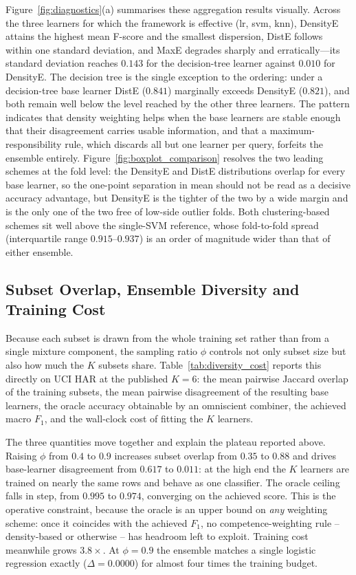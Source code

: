 \documentclass[lettersize,journal]{IEEEtran}
\begin{document}
	Figure~\ref{fig:diagnostics}(a) summarises these aggregation results visually. Across the three
	learners for which the framework is effective (lr, svm, knn), DensityE attains the highest mean
	F-score and the smallest dispersion, DistE follows within one standard deviation, and MaxE degrades
	sharply and erratically---its standard deviation reaches $0.143$ for the decision-tree learner
	against $0.010$ for DensityE. The decision tree is the single exception to the ordering: under a
	decision-tree base learner DistE ($0.841$) marginally exceeds DensityE ($0.821$), and both remain
	well below the level reached by the other three learners. The pattern indicates that density
	weighting helps when the base learners are stable enough that their disagreement carries usable
	information, and that a maximum-responsibility rule, which discards all but one learner per query,
	forfeits the ensemble entirely. Figure~\ref{fig:boxplot_comparison} resolves the two leading
	schemes at the fold level: the DensityE and DistE distributions overlap for every base learner,
	so the one-point separation in mean should not be read as a decisive accuracy advantage, but
	DensityE is the tighter of the two by a wide margin and is the only one of the two free of
	low-side outlier folds. Both clustering-based schemes sit well above the single-SVM reference,
	whose fold-to-fold spread (interquartile range $0.915$--$0.937$) is an order of magnitude wider
	than that of either ensemble.
	
	

	\subsection{Subset Overlap, Ensemble Diversity and Training Cost}
	\label{subsec:diversity_cost}
	Because each subset is drawn from the whole training set rather than from a single
	mixture component, the sampling ratio $\phi$ controls not only subset size but also how
	much the $K$ subsets share. Table~\ref{tab:diversity_cost} reports this directly on UCI
	HAR at the published $K = 6$: the mean pairwise Jaccard overlap of the training subsets,
	the mean pairwise disagreement of the resulting base learners, the oracle accuracy
	obtainable by an omniscient combiner, the achieved macro $F_1$, and the wall-clock cost
	of fitting the $K$ learners.

	The three quantities move together and explain the plateau reported above. Raising
	$\phi$ from $0.4$ to $0.9$ increases subset overlap from $0.35$ to $0.88$ and drives
	base-learner disagreement from $0.617$ to $0.011$: at the high end the $K$ learners are
	trained on nearly the same rows and behave as one classifier. The oracle ceiling falls
	in step, from $0.995$ to $0.974$, converging on the achieved score. This is the
	operative constraint, because the oracle is an upper bound on \emph{any} weighting
	scheme: once it coincides with the achieved $F_1$, no competence-weighting rule --
	density-based or otherwise -- has headroom left to exploit. Training cost meanwhile
	grows $3.8\times$. At $\phi = 0.9$ the ensemble matches a single logistic regression
	exactly ($\Delta = 0.0000$) for almost four times the training budget.
\end{document}
